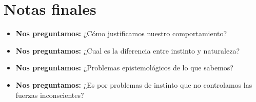 \section{Notas finales}
\begin{itemize}
    \item \textbf{Nos preguntamos:} ¿Cómo justificamos nuestro comportamiento?
    \item \textbf{Nos preguntamos:} ¿Cual es la diferencia entre instinto y naturaleza?
    \item \textbf{Nos preguntamos:} ¿Problemas epistemológicos de lo que sabemos?
    \item \textbf{Nos preguntamos:} ¿Es por problemas de instinto que no controlamos las fuerzas inconscientes?
\end{itemize}
